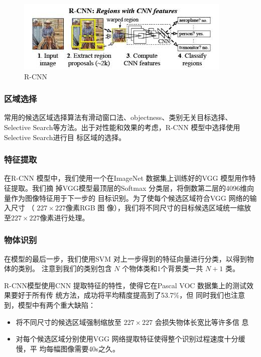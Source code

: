 \begin{figure}
  \centering
  \includegraphics[width=1.0\linewidth]{./Figure/RCNN.jpg}
  \caption{R-CNN}\label{Fig:RCNN}
\end{figure}

\subsubsection{区域选择}

常用的候选区域选择算法有滑动窗口法、objectness、类别无关目标选择、Selective
Search等方法。出于对性能和效果的考虑，R-CNN 模型中选择使用 Selective Search进行目
标区域的选择。

\subsubsection{特征提取}

在R-CNN 模型中，我们使用一个在ImageNet 数据集上训练好的VGG 模型用作特征提取。我们摘
掉VGG模型最顶层的Softmax 分类层，将倒数第二层的4096维向量作为图像特征用于下一步的
目标识别。为了使每个候选区域符合VGG 网络的输入尺寸 （ $227 \times 227$像素RGB 图
像），我们将不同尺寸的目标候选区域统一缩放至$227 \times 227$像素进行处理。

\subsubsection{物体识别}

在模型的最后一步，我们使用SVM 对上一步得到的特征向量进行分类，以得到物体的类别。
注意到我们的类别包含 $N$ 个物体类和1个背景类一共 $N+1$ 类。

R-CNN模型使用CNN 提取特征的特性，使得它在Pascal VOC 数据集上的测试效果要好于所有传
统方法，成功将平均精度提高到了53.7\%\cite{Girshick:2014jx}，但
同时我们也注意到，模型中有两个重大缺陷：

\begin{itemize}
  \item 将不同尺寸的候选区域强制缩放至 $227 \times 227$ 会损失物体长宽比等许多信
    息
  \item 对每个候选区域分别使用VGG 网络提取特征使得整个识别过程速度十分缓慢，平
     均每幅图像需要40s之久\cite{Girshick:2014jx}。
\end{itemize}


